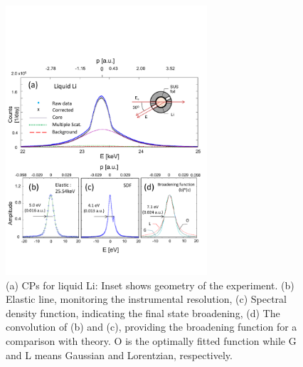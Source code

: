 \documentclass[twocolumn,showpacs,showkeys,fleqn,prl,superscriptaddress]{revtex4}%
\begin{document}
\begin{figure}
\includegraphics[bb= 30 50 500 600, width=7.5cm]{fig1.pdf}
\caption{(a) CPs for liquid Li: Inset shows geometry of the experiment. (b) Elastic line, monitoring the instrumental resolution, 
(c) Spectral density function, indicating the final state broadening, (d) The convolution of \small{(b)} and (c), providing the broadening function for a comparison with theory. O is the optimally fitted function while G and L means Gaussian and Lorentzian, respectively.  
} 
\label{Fig.1}
\end{figure}
\end{document}
